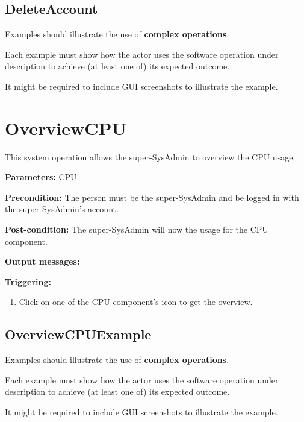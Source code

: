  
\subsection{DeleteAccount}
Examples should illustrate the use of \textbf{complex operations}.

Each example must show how the actor uses the software operation under
description to achieve (at least one of) its expected outcome.

It might be required to include GUI screenshots to illustrate the example.



\section{OverviewCPU}
\label{operation:overviewcpu}
This system operation allows the super-SysAdmin to overview the CPU usage.

\begin{description}

\item \textbf{Parameters:} CPU
\item \textbf{Precondition:} The person must be the super-SysAdmin and be logged
in with the super-SysAdmin's account.
\item \textbf{Post-condition:} The super-SysAdmin will now the usage for the CPU
component.
\item \textbf{Output messages:}

\item \textbf{Triggering:}
\begin{enumerate}
\item Click on one of the CPU component's icon to get the overview.
\end{enumerate}

 
\end{description}

\subsection{OverviewCPUExample}
Examples should illustrate the use of \textbf{complex operations}.

Each example must show how the actor uses the software operation under
description to achieve (at least one of) its expected outcome.

It might be required to include GUI screenshots to illustrate the example.







